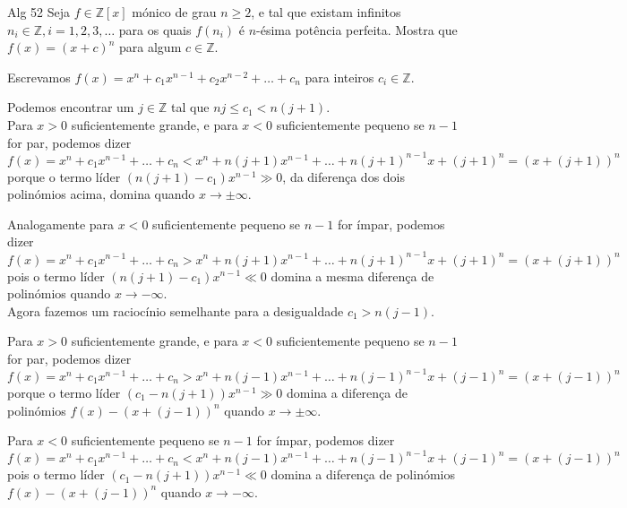\documentclass[repertorio-solutions-1.tex]{subfiles}
\begin{document}
\begin{problem}{Alg 52}
Seja $f\in\mathbb{Z}[x]$ mónico de grau $n\geq 2$, e tal que existam infinitos
$n_i\in\mathbb{Z}, i=1,2,3,\dots$ para os quais $f(n_i)$ é $n$-ésima potência
perfeita. Mostra que $f(x)=(x+c)^n$ para algum $c\in\mathbb{Z}$.
\end{problem}

\begin{solution}
Escrevamos $f(x)=x^n+c_1x^{n-1}+c_2x^{n-2}+\dots+c_n$
para inteiros $c_i\in\mathbb{Z}$.

Podemos encontrar um $j\in\mathbb{Z}$ tal que $nj\leq c_1<n(j+1)$.
\\

Para $x>0$ suficientemente grande, e para $x<0$ suficientemente pequeno
se $n-1$ for par, podemos dizer
\begin{equation*}
f(x)=x^n+c_1x^{n-1}+\dots+c_n
<x^n+n(j+1)x^{n-1}+\dots+n(j+1)^{n-1}x+(j+1)^n
=(x+(j+1))^n
\end{equation*}
porque o termo líder $(n(j+1)-c_1)x^{n-1}\gg 0$, da diferença dos dois
polinómios acima, domina quando $x\to\pm\infty$.

Analogamente para $x<0$ suficientemente pequeno se $n-1$ for ímpar,
podemos dizer
\begin{equation*}
f(x)=x^n+c_1x^{n-1}+\dots+c_n
>x^n+n(j+1)x^{n-1}+\dots+n(j+1)^{n-1}x+(j+1)^n
=(x+(j+1))^n
\end{equation*}
pois o termo líder $(n(j+1)-c_1)x^{n-1}\ll 0$ domina a mesma diferença de polinómios quando $x\to -\infty$.
\\

Agora fazemos um raciocínio semelhante para a desigualdade $c_1>n(j-1)$.

Para $x>0$ suficientemente grande, e para $x<0$ suficientemente pequeno
se $n-1$ for par, podemos dizer
\begin{equation*}
f(x)=x^n+c_1x^{n-1}+\dots+c_n
>x^n+n(j-1)x^{n-1}+\dots+n(j-1)^{n-1}x+(j-1)^n
=(x+(j-1))^n
\end{equation*}
porque o termo líder $(c_1-n(j+1))x^{n-1}\gg 0$ domina a diferença de polinómios
$f(x)-(x+(j-1))^n$ quando $x\to\pm\infty$.

Para $x<0$ suficientemente pequeno se $n-1$ for ímpar, podemos dizer
\begin{equation*}
f(x)=x^n+c_1x^{n-1}+\dots+c_n
<x^n+n(j-1)x^{n-1}+\dots+n(j-1)^{n-1}x+(j-1)^n
=(x+(j-1))^n
\end{equation*}
pois o termo líder $(c_1-n(j+1))x^{n-1}\ll 0$ domina a diferença de polinómios
$f(x)-(x+(j-1))^n$ quando $x\to -\infty$.
\\


\end{solution}
\end{document}

